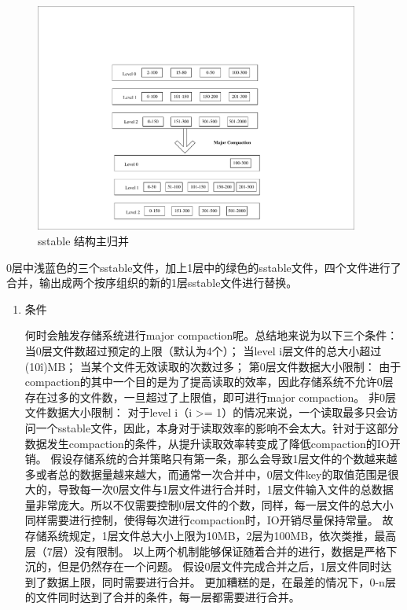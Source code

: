 \begin{enumerate}
\begin{enumerate}
				\begin{figure}[H]
					\centering
					\includegraphics[width=0.95\textwidth]{pdf/major_compaction.pdf}
					\caption{sstable 结构主归并}
					\label{sstable_major_compaction}
				\end{figure}
				
				0层中浅蓝色的三个sstable文件，加上1层中的绿色的sstable文件，四个文件进行了合并，输出成两个按序组织的新的1层sstable文件进行替换。
				

				\begin{enumerate}
					\item 条件
					
				何时会触发存储系统进行major compaction呢。总结地来说为以下三个条件：
				当0层文件数超过预定的上限（默认为4个）；
				当level i层文件的总大小超过(10\^i)MB；
				当某个文件无效读取的次数过多；
				第0层文件数据大小限制：
				由于compaction的其中一个目的是为了提高读取的效率，因此存储系统不允许0层存在过多的文件数，一旦超过了上限值，即可进行major compaction。
				非0层文件数据大小限制：
				对于level i（i >= 1）的情况来说，一个读取最多只会访问一个sstable文件，因此，本身对于读取效率的影响不会太大。针对于这部分数据发生compaction的条件，从提升读取效率转变成了降低compaction的IO开销。
				假设存储系统的合并策略只有第一条，那么会导致1层文件的个数越来越多或者总的数据量越来越大，而通常一次合并中，0层文件key的取值范围是很大的，导致每一次0层文件与1层文件进行合并时，1层文件输入文件的总数据量非常庞大。所以不仅需要控制0层文件的个数，同样，每一层文件的总大小同样需要进行控制，使得每次进行compaction时，IO开销尽量保持常量。
				故存储系统规定，1层文件总大小上限为10MB，2层为100MB，依次类推，最高层（7层）没有限制。
				以上两个机制能够保证随着合并的进行，数据是严格下沉的，但是仍然存在一个问题。
				假设0层文件完成合并之后，1层文件同时达到了数据上限，同时需要进行合并。
				更加糟糕的是，在最差的情况下，0-n层的文件同时达到了合并的条件，每一层都需要进行合并。
				

\end{enumerate}
\end{enumerate}
\end{enumerate}
